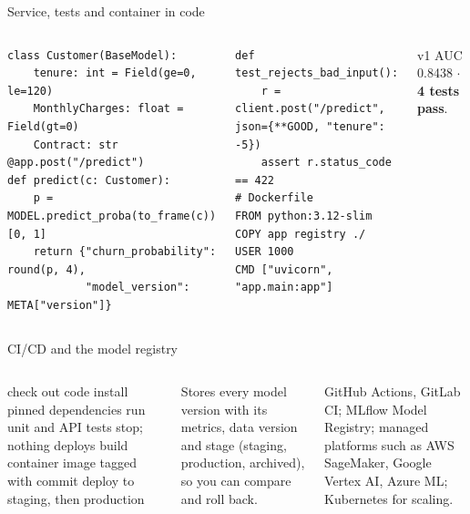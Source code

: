 \documentclass[aspectratio=169,11pt]{beamer}
\begin{document}
\begin{frame}[fragile]{Service, tests and container in code}
\begin{columns}[T]
\begin{bcode}
\begin{lstlisting}
class Customer(BaseModel):
    tenure: int = Field(ge=0, le=120)
    MonthlyCharges: float = Field(gt=0)
    Contract: str
@app.post("/predict")
def predict(c: Customer):
    p = MODEL.predict_proba(to_frame(c))[0, 1]
    return {"churn_probability": round(p, 4),
            "model_version": META["version"]}
\end{lstlisting}
\end{bcode}
\begin{bcode}
\begin{lstlisting}
def test_rejects_bad_input():
    r = client.post("/predict", json={**GOOD, "tenure": -5})
    assert r.status_code == 422
# Dockerfile
FROM python:3.12-slim
COPY app registry ./
USER 1000
CMD ["uvicorn", "app.main:app"]
\end{lstlisting}
\end{bcode}
\begin{bres}
v1 AUC 0.8438 $\cdot$ \textbf{4 tests pass}.
\end{bres}
\end{columns}
\end{frame}

\begin{frame}{CI/CD and the model registry}
\begin{columns}[T]
\begin{balgo}
\begin{algorithmic}[1]
\State check out code
\State install pinned dependencies
\State run unit and API tests
 \State stop; nothing deploys \EndIf
\State build container image tagged with commit
\State deploy to staging, then production
\end{algorithmic}
\end{balgo}
\begin{bdef}
Stores every model version with its metrics, data version and stage (staging, production, archived), so you can compare and roll back.
\end{bdef}
\begin{bapp}
GitHub Actions, GitLab CI; MLflow Model Registry; managed platforms such as AWS SageMaker, Google Vertex AI, Azure ML; Kubernetes for scaling.
\end{bapp}
\end{columns}
\end{frame}
\end{document}

